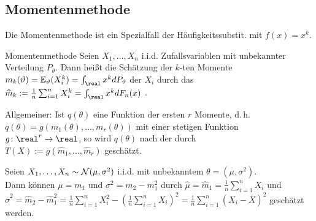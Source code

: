 \pagebreak

\subsection{%
    Momentenmethode%
}

\begin{Bem}
    Die Momentenmethode ist ein Spezialfall der Häufigkeitssubstit. mit $f(x) = x^k$.
\end{Bem}

\begin{Def}{Momentenmethode}
    Seien $X_1, \dotsc, X_n$ i.i.d. Zufallsvariablen mit unbekannter Verteilung $P_\theta$.
    Dann heißt die Schätzung der $k$-ten Momente
    $m_k(\theta) = \EE_\theta(X_i^k) = \int_\real x^k dP_\theta$ der $X_i$ durch
    das 
    $\widehat{m}_k := \frac{1}{n} \sum_{i=1}^n X_i^k = \int_\real x^k dF_n(x)$
    .

    Allgemeiner:
    Ist $q(\theta)$ eine Funktion der ersten $r$ Momente, d.\,h.
    $q(\theta) = g(m_1(\theta), \dotsc, m_r(\theta))$ mit einer stetigen Funktion
    $g\colon \real^r \rightarrow \real$,
    so wird $q(\theta)$ nach der  durch\\
    $T(X) := g(\widehat{m}_1, \dotsc, \widehat{m}_r)$ geschätzt.
\end{Def}

\linie

\begin{Bsp}
    Seien $X_1, \dotsc, X_n \sim \mathcal{N}(\mu, \sigma^2)$ i.i.d. mit unbekanntem
    $\theta = (\mu, \sigma^2)$.\\
    Dann können $\mu = m_1$ und $\sigma^2 = m_2 - m_1^2$ durch
    $\widehat{\mu} = \widehat{m}_1 = \frac{1}{n} \sum_{i=1}^n X_i$ und\\
    $\widehat{\sigma}^2 = \widehat{m}_2 - \widehat{m}_1^2 =
    \frac{1}{n} \sum_{i=1}^n X_i^2 - \left(\frac{1}{n} \sum_{i=1}^n X_i\right)^2
    = \frac{1}{n} \sum_{i=1}^n (X_i - \overline{X})^2$ geschätzt werden.
\end{Bsp}

